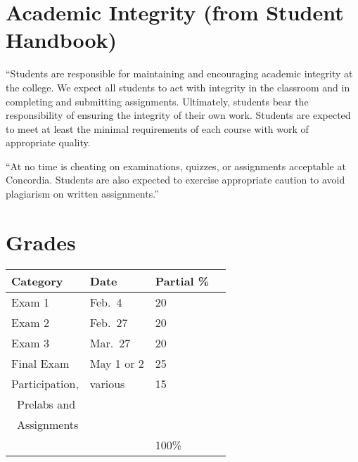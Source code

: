\documentclass{tufte-handout}
\begin{document}
\section{Academic Integrity (from Student Handbook)}



``Students are responsible for maintaining and encouraging academic integrity at the college. We expect all students to act with integrity in the classroom and in completing and submitting assignments. Ultimately, students bear the responsibility of ensuring the integrity of their own work. Students are expected to meet at least the minimal requirements of each course with work of appropriate quality. 


``At no time is cheating on examinations, quizzes, or assignments acceptable at Concordia. Students are also expected to exercise appropriate caution to avoid plagiarism on written assignments.''

\section{Grades}

\begin{tabular}{l l l r}
Category &  Date & Partial \%  \\
\hline
 Exam 1 & Feb.\ 4 & 20 \\							%
 Exam 2 & Feb.\ 27 & 20 \\							%
 Exam 3 & Mar.\ 27 & 20 \\						%
 Final Exam & May 1 or 2 & 25 \\ 							%
Participation,  &  various  & 15 \\
\, Prelabs and \\
\, Assignments \\
\hline
& &   100\%
\end{tabular}
\end{document}
